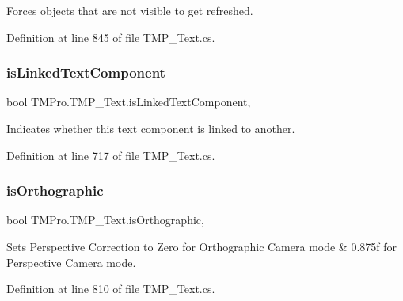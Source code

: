 Forces objects that are not visible to get refreshed. 



Definition at line 845 of file T\+M\+P\+\_\+\+Text.\+cs.

\mbox{\label{class_t_m_pro_1_1_t_m_p___text_ae3c8b615e7605495fa172a197140bb8b}} 
\subsubsection{\texorpdfstring{isLinkedTextComponent}{isLinkedTextComponent}}
{\footnotesize\ttfamily bool T\+M\+Pro.\+T\+M\+P\+\_\+\+Text.\+is\+Linked\+Text\+Component\hspace{0.3cm}{\ttfamily [get]}, {\ttfamily [set]}}



Indicates whether this text component is linked to another. 



Definition at line 717 of file T\+M\+P\+\_\+\+Text.\+cs.

\mbox{\label{class_t_m_pro_1_1_t_m_p___text_a00f0401315f7bc45fb8922b8284e894b}} 
\subsubsection{\texorpdfstring{isOrthographic}{isOrthographic}}
{\footnotesize\ttfamily bool T\+M\+Pro.\+T\+M\+P\+\_\+\+Text.\+is\+Orthographic\hspace{0.3cm}{\ttfamily [get]}, {\ttfamily [set]}}



Sets Perspective Correction to Zero for Orthographic Camera mode \& 0.\+875f for Perspective Camera mode. 



Definition at line 810 of file T\+M\+P\+\_\+\+Text.\+cs.

\mbox{\label{class_t_m_pro_1_1_t_m_p___text_ac3d29530dd5635c1649496be1b6b7613}} 
